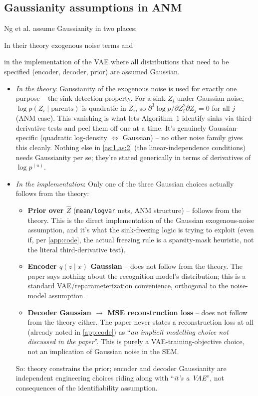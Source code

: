 \subsection{Gaussianity assumptions in ANM}
Ng et al. assume Gaussianity in two places: 
\begin{enumerate*}[label=(\roman*)]
\item In their theory exogenous noise terms and 
\item in the implementation of the VAE where all distributions that need to be specified (encoder, decoder, prior) are assumed Gaussian.
\end{enumerate*}
\begin{itemize}
\item \textit{In the theory}: Gaussianity of the exogenous noise is used for exactly one purpose -- the 
sink-detection property. For a sink $Z_i$ under Gaussian noise, $\log p(Z_i\mid\text{parents})$ is 
quadratic in $Z_i$, so $\partial^3\log p/\partial Z_i^2\partial Z_j=0$ for all $j$ (ANM case). This 
vanishing is what lets Algorithm~1 identify sinks via third-derivative tests and peel them off one 
at a time. It's genuinely Gaussian-specific (quadratic log-density $\Leftrightarrow$ Gaussian) -- no 
other noise family gives this cleanly. Nothing else in \cref{as:1,as:2}
(the linear-independence conditions) needs Gaussianity per se; they're stated generically in terms 
of derivatives of $\log p^{(u)}$.
\item \textit{In the implementation}: Only one of the three Gaussian choices actually follows from 
the theory:
\begin{itemize}
\item \textbf{Prior over $\hat Z$} (\texttt{mean/logvar} nets, ANM structure) -- follows from the 
theory. This is the direct implementation of the Gaussian exogenous-noise assumption, and it's what the 
sink-freezing logic is trying to exploit (even if, per \cref{app:code}, the actual freezing rule is a 
sparsity-mask heuristic, not the literal third-derivative test).
\item \textbf{Encoder $q(z\mid x)$ Gaussian} -- does not follow from the theory. The paper says nothing 
about the recognition model's distribution; this is a standard VAE/reparameterization convenience, 
orthogonal to the noise-model assumption.
\item \textbf{Decoder Gaussian $\rightarrow$ MSE reconstruction loss} -- does not follow from the theory 
either. The paper never states a reconstruction loss at all (already noted in \cref{app:code}) as
``\textit{an implicit modelling choice not discussed in the paper}''.
This is purely a VAE-training-objective choice, not an implication of Gaussian noise in the SEM.
\end{itemize}
So: theory constrains the prior; encoder and decoder Gaussianity are independent engineering choices 
riding along with ``\textit{it's a VAE}'', not consequences of the identifiability assumption.
\end{itemize}

